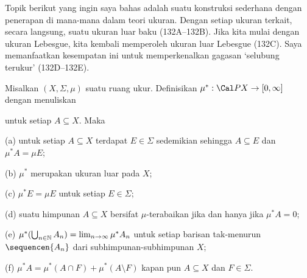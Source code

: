 
\def\chaptername{Pelengkap}
\def\sectionname{Ukuran luar dari ukuran}


Topik berikut yang ingin saya bahas adalah suatu konstruksi sederhana dengan
penerapan di mana-mana dalam teori ukuran. Dengan setiap ukuran terkait,
secara langsung, suatu ukuran luar baku (132A–132B). Jika kita mulai dengan
ukuran Lebesgue, kita kembali memperoleh ukuran luar Lebesgue (132C). Saya
memanfaatkan kesempatan ini untuk memperkenalkan gagasan `selubung terukur'
(132D–132E).

 Misalkan $(X,\Sigma,\mu)$ suatu ruang ukur.
Definisikan $\mu^*: \Cal PX\to[0,\infty]$ dengan menuliskan


\noindent untuk setiap $A\subseteq X$. Maka

(a) untuk setiap $A\subseteq X$ terdapat $E\in\Sigma$ sedemikian sehingga
$A\subseteq E$ dan $\mu^*A=\mu E$;

(b) $\mu^*$ merupakan ukuran luar pada $X$;

(c) $\mu^*E=\mu E$ untuk setiap $E\in\Sigma$;

(d) suatu himpunan $A\subseteq X$ bersifat $\mu$-terabaikan jika dan hanya
jika $\mu^*A=0$;

(e) $\mu^*(\bigcup_{n\in\Bbb N}A_n)=\lim_{n\to\infty}\mu^*A_n$ untuk
setiap barisan tak-menurun $\sequencen{A_n}$ dari subhimpunan-subhimpunan
$X$;

(f) $\mu^*A=\mu^*(A\cap F)+\mu^*(A\setminus F)$ kapan pun
$A\subseteq X$ dan $F\in\Sigma$.

